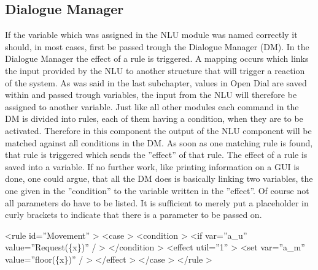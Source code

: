 \subsection{Dialogue Manager}

If the variable which was assigned in the NLU module was named correctly it should, in most cases, first be passed trough the Dialogue Manager (DM).
In the Dialogue Manager the effect of a rule is triggered. A mapping occurs which links the input provided by the NLU to another structure that will trigger a reaction of the system.
As was said in the last subchapter, values in Open Dial are saved within and passed trough variables, the input from the NLU will therefore be assigned to another variable. \newline
Just like all other modules each command in the DM is divided into rules, each of them having a condition, when they are to be activated. 
Therefore in this component the output of the NLU component will be matched against all conditions in the DM. 
As soon as one matching rule is found, that rule is triggered which sends the ”effect” of that rule.
The effect of a rule is saved into a variable.
If no further work, like printing information on a GUI is done, one could argue, that all the DM does is basically linking two variables, the one given in the ”condition” to the variable written in the ”effect”.
Of course not all parameters do have to be listed.
It is sufficient to merely put a placeholder in curly brackets to indicate that there is a parameter to be passed on. \newline


\textless rule id=”Movement” \textgreater \newline
 \indent \indent \textless case \textgreater \newline
\indent \indent \indent \textless condition \textgreater \newline
\indent \indent \indent \indent \textless if var=”a\_u” value=”Request(\{x\})” / \textgreater \newline
 \indent \indent \indent \textless /condition \textgreater \newline
 \indent \indent \indent \textless effect util=”1” \textgreater \newline 
 \indent \indent \indent \indent \textless set var=”a\_m” value=”floor(\{x\})” / \textgreater \newline
 \indent \indent \indent \textless /effect \textgreater \newline
\indent \indent \textless /case \textgreater \newline
\indent \textless /rule \textgreater \newline

